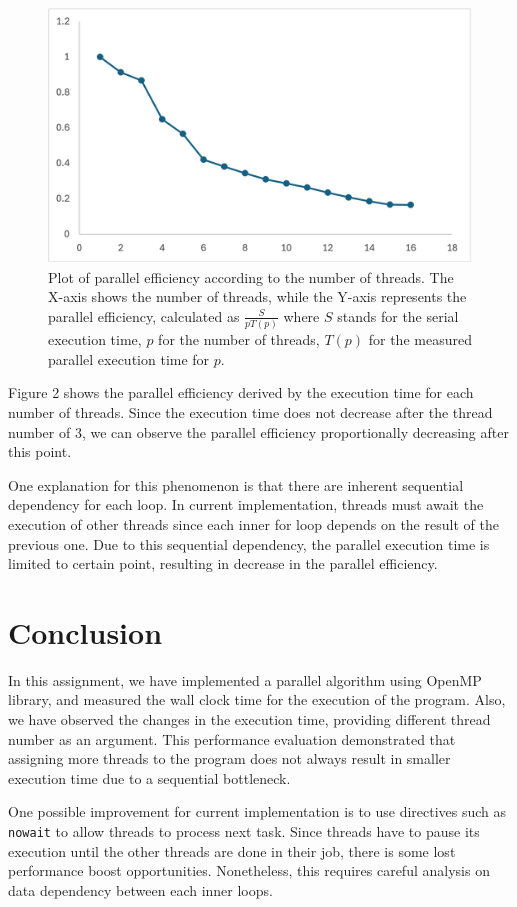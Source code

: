 \documentclass{article}
\begin{document}
\begin{figure}[h]
\centering
\includegraphics[width=.75\textwidth]{figure2.png}
\caption{
    Plot of parallel efficiency according to the number of threads. The X-axis 
    shows the number of threads, while the Y-axis represents the parallel 
    efficiency, calculated as $\frac{S}{pT(p)}$ where $S$ stands for
    the serial execution time, $p$ for the number of threads, $T(p)$ for the
    measured parallel execution time for $p$.
}
\end{figure}

Figure 2 shows the parallel efficiency derived by the execution time for each
number of threads. Since the execution time does not decrease after the thread
number of 3, we can observe the parallel efficiency proportionally decreasing
after this point.

One explanation for this phenomenon is that there are inherent sequential 
dependency for each loop. In current implementation, threads must await the
execution of other threads since each inner for loop depends on the result
of the previous one. Due to this sequential dependency, the parallel execution
time is limited to certain point, resulting in decrease in the parallel 
efficiency.

\section{Conclusion}
In this assignment, we have implemented a parallel algorithm using OpenMP 
library, and measured the wall clock time for the execution of the program. 
Also, we have observed the changes in the execution time, providing different
thread number as an argument. This performance evaluation demonstrated that 
assigning more threads to the program does not always result in smaller 
execution time due to a sequential bottleneck. 

One possible improvement for current implementation is to use directives such
as \verb|nowait| to allow threads to process next task. Since threads have to
pause its execution until the other threads are done in their job, there is
some lost performance boost opportunities. Nonetheless, this requires careful
analysis on data dependency between each inner loops.
\end{document}
